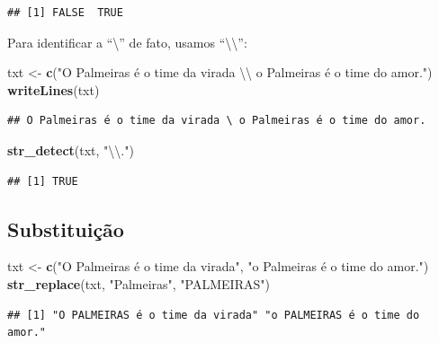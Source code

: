 \documentclass[]{book}
\newenvironment{Shaded}{\begin{snugshade}}{\end{snugshade}}
\newcommand{\CharTok}[1]{\textcolor[rgb]{0.31,0.60,0.02}{#1}}
\newcommand{\KeywordTok}[1]{\textcolor[rgb]{0.13,0.29,0.53}{\textbf{#1}}}
\newcommand{\NormalTok}[1]{#1}
\newcommand{\StringTok}[1]{\textcolor[rgb]{0.31,0.60,0.02}{#1}}
\begin{document}
\begin{verbatim}
## [1] FALSE  TRUE
\end{verbatim}

Para identificar a ``\textbackslash{}'' de fato, usamos ``\textbackslash{}\textbackslash{}'':

\begin{Shaded}
\begin{Highlighting}[]
\NormalTok{txt <-}\StringTok{ }\KeywordTok{c}\NormalTok{(}\StringTok{"O Palmeiras é o time da virada }\CharTok{\textbackslash{}\textbackslash{}}\StringTok{ o Palmeiras é o time do amor."}\NormalTok{)}
\KeywordTok{writeLines}\NormalTok{(txt)}
\end{Highlighting}
\end{Shaded}

\begin{verbatim}
## O Palmeiras é o time da virada \ o Palmeiras é o time do amor.
\end{verbatim}

\begin{Shaded}
\begin{Highlighting}[]
\KeywordTok{str_detect}\NormalTok{(txt, }\StringTok{"}\CharTok{\textbackslash{}\textbackslash{}}\StringTok{."}\NormalTok{)}
\end{Highlighting}
\end{Shaded}

\begin{verbatim}
## [1] TRUE
\end{verbatim}

\hypertarget{substituiuxe7uxe3o}{%
\subsection{Substituição}\label{substituiuxe7uxe3o}}

\begin{Shaded}
\begin{Highlighting}[]
\NormalTok{txt <-}\StringTok{ }\KeywordTok{c}\NormalTok{(}\StringTok{"O Palmeiras é o time da virada"}\NormalTok{, }\StringTok{"o Palmeiras é o time do amor."}\NormalTok{)}
\KeywordTok{str_replace}\NormalTok{(txt, }\StringTok{"Palmeiras"}\NormalTok{, }\StringTok{"PALMEIRAS"}\NormalTok{)}
\end{Highlighting}
\end{Shaded}

\begin{verbatim}
## [1] "O PALMEIRAS é o time da virada" "o PALMEIRAS é o time do amor."
\end{verbatim}
\end{document}
